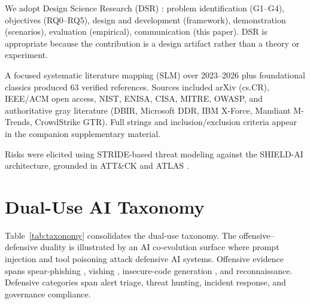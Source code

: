\documentclass[journal]{IEEEtran}
\begin{document}
We adopt Design Science Research (DSR) \cite{hevner2004dsr,peffers2007dsrm}: problem
identification (G1--G4), objectives (RQ0--RQ5), design and development (framework),
demonstration (scenarios), evaluation (empirical), communication (this paper). DSR is
appropriate because the contribution is a design artifact rather than a theory or experiment.

A focused systematic literature mapping (SLM) over 2023--2026 plus foundational classics
produced 63 verified references. Sources included arXiv (cs.CR), IEEE/ACM open access, NIST,
ENISA, CISA, MITRE, OWASP, and authoritative gray literature (DBIR, Microsoft DDR, IBM X-Force,
Mandiant M-Trends, CrowdStrike GTR). Full strings and inclusion/exclusion criteria appear in
the companion supplementary material.

Risks were elicited using STRIDE-based threat modeling against the SHIELD-AI architecture,
grounded in ATT\&CK \cite{mitre2024attck} and ATLAS \cite{mitre2025atlas}.

\section{Dual-Use AI Taxonomy}
\label{sec:taxonomy}

Table~\ref{tab:taxonomy} consolidates the dual-use taxonomy. The offensive--defensive duality
is illustrated by an AI co-evolution surface where prompt injection
\cite{greshake2023indirect,liu2024formalizing} and tool poisoning \cite{owasp2025agentic}
attack defensive AI systems. Offensive evidence spans spear-phishing \cite{hazell2023spear},
vishing \cite{crowdstrike2025}, insecure-code generation \cite{bhatt2023cyberseceval}, and
reconnaissance. Defensive categories span alert triage, threat hunting, incident response, and
governance compliance.
\end{document}
